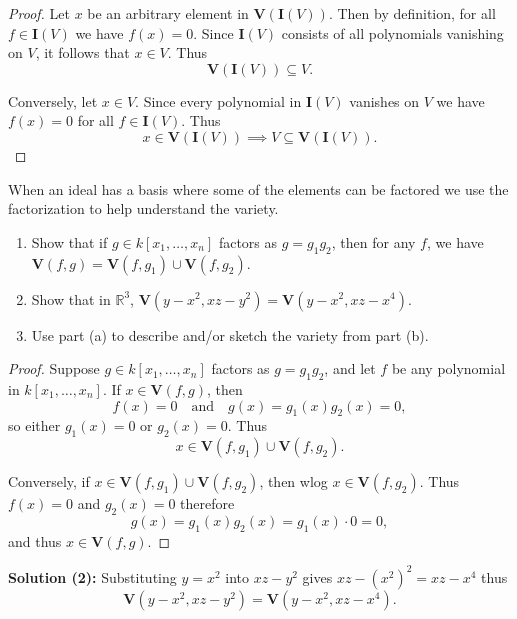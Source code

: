 \begin{proof}
    Let $x$ be an arbitrary element in $\mathbf{V}(\mathbf{I}(V))$.
    Then by definition, for all $f \in \mathbf{I}(V)$ we have $f(x) = 0$.
    Since $\mathbf{I}(V)$ consists of all polynomials vanishing on $V$,
    it follows that $x \in V$. Thus
    \[\mathbf{V}(\mathbf{I}(V)) \subseteq V.\]

    Conversely, let $x \in V$. Since
        every polynomial in $\mathbf{I}(V)$ vanishes on $V$ we have
        $f(x) = 0$ for all $f \in \mathbf{I}(V)$. Thus
    \[x \in \mathbf{V}(\mathbf{I}(V)) \implies V \subseteq \mathbf{V}(\mathbf{I}(V)).\]
\end{proof}

\begin{tcolorbox}[title=Problem 18, breakable]
    When an ideal has a basis where some of the elements 
    can be factored we use the factorization to help 
    understand the variety.
    \begin{enumerate}
        \item Show that if $g \in k[x_1, \ldots, x_n]$ factors 
        as $g = g_1 g_2$, then for any $f$, we have $\textbf{V}(f, g) = \textbf{V}(f, g_1) \cup \textbf{V}(f, g_2)$.
        \item Show that in $\mathbb{R}^3$, $\textbf{V}(y - x^2, xz - y^2) = \textbf{V}(y - x^2, xz - x^4)$.
        \item Use part (a) to describe and/or sketch the variety from part (b).
    \end{enumerate}
\end{tcolorbox}

\begin{proof}
    Suppose $g \in k[x_1, \ldots, x_n]$ factors as $g = g_1 g_2$,
    and let $f$ be any polynomial in $k[x_1, \ldots, x_n]$.
    If $x \in \mathbf{V}(f, g)$, then 
    \[f(x) = 0 \quad \text{and} \quad g(x) = g_1(x) g_2(x) = 0,\] 
    so either $g_1(x) = 0$ or $g_2(x) = 0$. Thus
    \[x \in \mathbf{V}(f, g_1) \cup \mathbf{V}(f, g_2).\]

    Conversely, if $x \in \mathbf{V}(f, g_1) \cup \mathbf{V}(f, g_2)$,
    then wlog $x \in \mathbf{V}(f, g_2)$. 
    Thus $f(x) = 0$ and $g_2(x) = 0$ therefore
    \[g(x) = g_1(x) g_2(x) = g_1(x) \cdot 0 = 0,\] 
    and thus $x \in \mathbf{V}(f, g)$.
\end{proof}

\textbf{Solution (2):}
Substituting $y = x^2$ into $xz - y^2$ gives 
$xz - (x^2)^2 = xz - x^4$ thus
\[\mathbf{V}(y - x^2, xz - y^2) = \mathbf{V}(y - x^2, xz - x^4).\]

